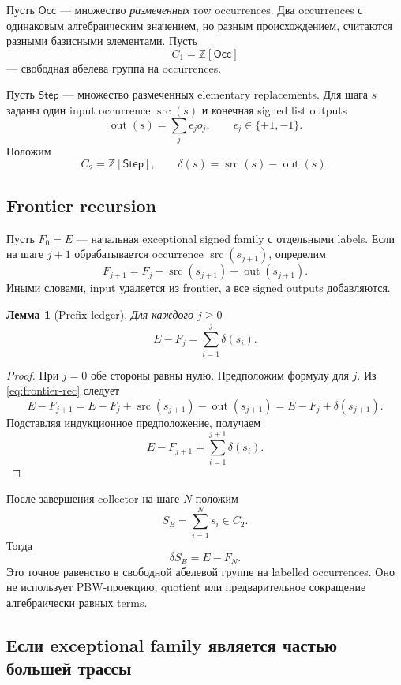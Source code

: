 \documentclass[11pt,a4paper]{article}
\newtheorem{lemma}[theorem]{Лемма}
\theoremstyle{definition}
\theoremstyle{remark}
\newcommand{\Z}{\mathbb Z}
\newcommand{\src}{\operatorname{src}}
\newcommand{\out}{\operatorname{out}}
\begin{document}
Пусть $\mathsf{Occ}$ --- множество \emph{размеченных} row occurrences. Два
occurrences с одинаковым алгебраическим значением, но разным происхождением,
считаются разными базисными элементами. Пусть
\[
 C_1=\Z[\mathsf{Occ}]
\]
--- свободная абелева группа на occurrences.

Пусть $\mathsf{Step}$ --- множество размеченных elementary replacements. Для
шага $s$ заданы один input occurrence $\src(s)$ и конечная signed list outputs
\[
 \out(s)=\sum_j\epsilon_j o_j,
 \qquad \epsilon_j\in\{+1,-1\}.
\]
Положим
\[
 C_2=\Z[\mathsf{Step}],
 \qquad
 \delta(s)=\src(s)-\out(s).
\]

\subsection{Frontier recursion}

Пусть $F_0=E$ --- начальная exceptional signed family с отдельными labels.
Если на шаге $j+1$ обрабатывается occurrence $\src(s_{j+1})$, определим
\begin{equation}\label{eq:frontier-rec}
 F_{j+1}=F_j-\src(s_{j+1})+\out(s_{j+1}).
\end{equation}
Иными словами, input удаляется из frontier, а все signed outputs добавляются.

\begin{lemma}[Prefix ledger]\label{lem:prefix-ledger-doc}
Для каждого $j\ge0$
\begin{equation}\label{eq:prefix-ledger-doc}
 E-F_j=\sum_{i=1}^{j}\delta(s_i).
\end{equation}
\end{lemma}

\begin{proof}
При $j=0$ обе стороны равны нулю. Предположим формулу для $j$. Из
\eqref{eq:frontier-rec} следует
\[
 E-F_{j+1}
 =E-F_j+\src(s_{j+1})-\out(s_{j+1})
 =E-F_j+\delta(s_{j+1}).
\]
Подставляя индукционное предположение, получаем
\[
 E-F_{j+1}
 =\sum_{i=1}^{j+1}\delta(s_i).
\]
\end{proof}

После завершения collector на шаге $N$ положим
\[
 S_E=\sum_{i=1}^{N}s_i\in C_2.
\]
Тогда
\begin{equation}\label{eq:complete-ledger-doc}
 \delta S_E=E-F_N.
\end{equation}
Это точное равенство в свободной абелевой группе на labelled occurrences.
Оно не использует PBW-проекцию, quotient или предварительное сокращение
алгебраически равных terms.

\subsection{Если exceptional family является частью большей трассы}
\end{document}

